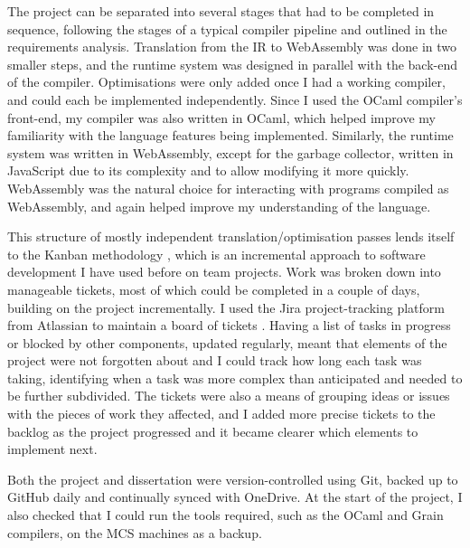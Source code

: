 The project can be separated into several stages that had to be completed in sequence, following the stages of a typical compiler pipeline and outlined in the requirements analysis. Translation from the IR to WebAssembly was done in two smaller steps, and the runtime system was designed in parallel with the back-end of the compiler. Optimisations were only added once I had a working compiler, and could each be implemented independently. Since I used the OCaml compiler's front-end, my compiler was also written in OCaml, which helped improve my familiarity with the language features being implemented. Similarly, the runtime system was written in WebAssembly, except for the garbage collector, written in JavaScript due to its complexity and to allow modifying it more quickly. WebAssembly was the natural choice for interacting with programs compiled as WebAssembly, and again helped improve my understanding of the language.

This structure of mostly independent translation/optimisation passes lends itself to the Kanban methodology \cite{kanban}, which is an incremental approach to software development I have used before on team projects. Work was broken down into manageable tickets, most of which could be completed in a couple of days, building on the project incrementally. I used the Jira project-tracking platform from Atlassian to maintain a board of tickets \cite{jira}. Having a list of tasks in progress or blocked by other components, updated regularly, meant that elements of the project were not forgotten about and I could track how long each task was taking, identifying when a task was more complex than anticipated and needed to be further subdivided. The tickets were also a means of grouping ideas or issues with the pieces of work they affected, and I added more precise tickets to the backlog as the project progressed and it became clearer which elements to implement next.


Both the project and dissertation were version-controlled using Git, backed up to GitHub daily and continually synced with OneDrive. %
At the start of the project, I also checked that I could run the tools required, such as the OCaml and Grain compilers, on the MCS machines as a backup. 

